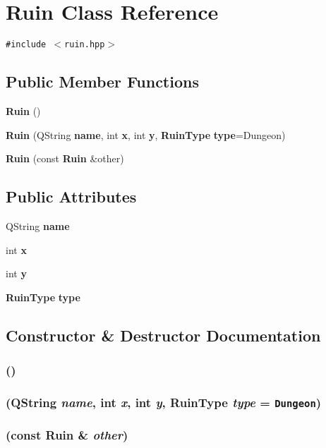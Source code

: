 \section{Ruin Class Reference}
\label{classRuin}
{\tt \#include $<$ruin.hpp$>$}

\subsection*{Public Member Functions}
\begin{CompactItemize}
\item 
{\bf Ruin} ()
\item 
{\bf Ruin} (QString {\bf name}, int {\bf x}, int {\bf y}, {\bf Ruin\-Type} {\bf type}=Dungeon)
\item 
{\bf Ruin} (const {\bf Ruin} \&other)
\end{CompactItemize}
\subsection*{Public Attributes}
\begin{CompactItemize}
\item 
QString {\bf name}
\item 
int {\bf x}
\item 
int {\bf y}
\item 
{\bf Ruin\-Type} {\bf type}
\end{CompactItemize}


\subsection{Constructor \& Destructor Documentation}
\subsubsection{ ()}\label{classRuin_a0}


\subsubsection{ (QString {\em name}, int {\em x}, int {\em y}, {\bf Ruin\-Type} {\em type} = {\tt Dungeon})}\label{classRuin_a1}


\subsubsection{ (const {\bf Ruin} \& {\em other})}\label{classRuin_a2}




